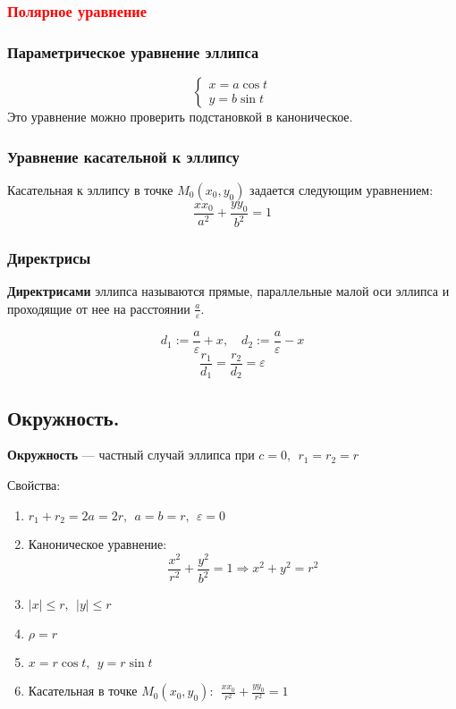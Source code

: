 \subsubsection{\textcolor{red}{Полярное уравнение}}

\subsubsection{Параметрическое уравнение эллипса}
$$\begin{cases}
        x=a\cos t \\
        y=b\sin t
    \end{cases}$$
Это уравнение можно проверить подстановкой в каноническое.

\subsubsection{Уравнение касательной к эллипсу}
Касательная к эллипсу в точке $M_0(x_0,y_0)$ задается следующим уравнением:
$$\frac{xx_0}{a^2}+\frac{yy_0}{b^2}=1$$

\subsubsection{Директрисы}
\begin{definition}
    \textbf{Директрисами} эллипса называются прямые, параллельные малой оси эллипса и проходящие от нее на расстоянии $\frac{a}{\varepsilon}$.
\end{definition}
$$d_1:=\frac{a}{\varepsilon}+x,\quad d_2:=\frac{a}{\varepsilon}-x$$
$$\frac{r_1}{d_1}=\frac{r_2}{d_2}=\varepsilon$$

\subsection{Окружность.}
\begin{definition}
    \textbf{Окружность} --- частный случай эллипса при $c=0,\ \  r_1=r_2=r$
\end{definition}
Свойства:
\begin{enumerate}
    \item $r_1+r_2=2a=2r, \ \ a=b=r, \ \ \varepsilon=0$
    \item Каноническое уравнение:
          $$\frac{x^2}{r^2}+\frac{y^2}{b^2}=1\Rightarrow x^2+y^2=r^2$$
    \item $|x|\leq r, \ \ |y|\leq r$
    \item $\rho =r$
    \item $x=r\cos t, \ \ y=r\sin t$
    \item Касательная в точке $M_0(x_0, y_0):\ \ \frac{xx_0}{r^2}+\frac{yy_0}{r^2}=1$
\end{enumerate}

